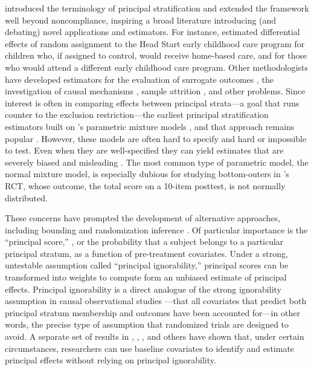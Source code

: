 \documentclass[]{article}
\begin{document}
\citet{frangakis} introduced the terminology of principal stratification and extended the framework well beyond noncompliance, inspiring a broad literature introducing (and debating) novel applications and estimators.
For instance, \citet{fellerEtAl2016} estimated differential effects of random assignment to the Head Start early childhood care program for children who, if assigned to control, would receive home-based care, and for those who would attend a different early childhood care program.
Other methodologists have developed estimators for the evaluation of surrogate outcomes \citep{li2010bayesian}, the investigation of causal mechanisms \citep{lidsayPage}, sample attrition \citep{zhangRubin, ding2011}, and other problems.
Since interest is often in comparing effects between principal strata---a goal that runs counter to the exclusion restriction---the earliest principal stratification estimators built on \citet{imbens1997}'s parametric mixture models \citep[e.g.][]{Barnard01062003,mealli2004analyzing}, and that approach remains popular \citep{lidsayPage,fellerEtaAl2016}.
However, these models are often hard to specify and hard or impossible to test.
Even when they are well-specified they can yield estimates that are severely biased and misleading \citep{griffin2008application,feller2016principal}.
The most common type of parametric model, the normal mixture model, is especially dubious for studying bottom-outers in \citet{impactPaper}'s RCT, whose outcome, the total score on a 10-item posttest, is not normally distributed.

These concerns have prompted the development of alternative approaches, including bounding \citep{bounding} and randomization inference \citep{nolen2011randomization}.
Of particular importance is the ``principal score,'' \citep{jo,dingLu,feller2017principal}, or the probability that a subject belongs to a particular principal stratum, as a function of pre-treatment covariates.
Under a strong, untestable assumption called ``principal ignorability,''  principal scores can be transformed into weights to compute form an unbiased estimate of principal effects.
Principal ignorability is a direct analogue of the strong ignorability assumption in causal observational studies \citep[e.g.][]{rosenbaum1986central}---that all covariates that predict both principal stratum membership and outcomes have been accounted for---in other words, the precise type of assumption that randomized trials are designed to avoid.
A separate set of results in \citet{jo2002}, \citet{ding2011}, \citet{jiangDing2021}, and others have shown that, under certain circumstances, researchers can use baseline covariates to identify and estimate principal effects without relying on principal ignorability.
\end{document}
